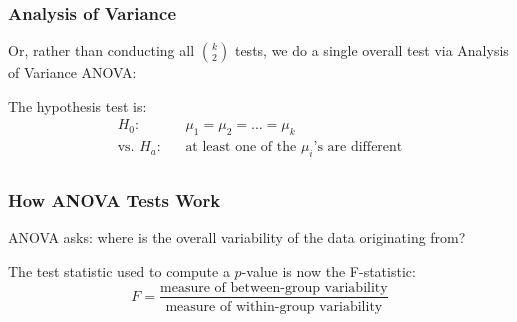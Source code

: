 \documentclass[handout]{beamer}
\newcommand{\blue}[1]{\textcolor{blue2}{#1}}
\begin{document}
\begin{frame}
\frametitle{Analysis of Variance}
Or, rather than conducting all ${k \choose 2}$ tests, we do \blue{a single overall test} via \blue{Analysis of Variance ANOVA}:

\vspace{0.5cm}

\pause The hypothesis test is:
\begin{eqnarray*}
H_0: && \mu_1 = \mu_2 = \ldots = \mu_k\\
\mbox{vs. } H_a:  && \mbox{at least one of the $\mu_i$'s are different}\\
\end{eqnarray*}
\end{frame}


\begin{frame}
\frametitle{How ANOVA Tests Work}
ANOVA asks:  where is the overall variability of the data originating from?

\vspace{0.5cm}

\pause The \blue{test statistic} used to compute a $p$-value is now the \blue{F-statistic}:
\[
F = \frac{\mbox{measure of between-group variability}}{\mbox{measure of within-group variability}}
\]
\end{frame}
\end{document}
